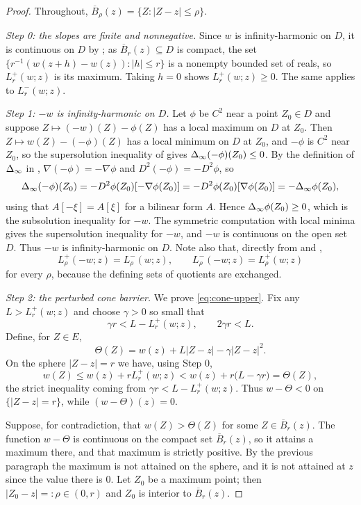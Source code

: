 \begin{proof}
Throughout, $\overline B_\rho(z)=\{Z:|Z-z|\le\rho\}$.

\emph{Step 0: the slopes are finite and nonnegative.}
Since $w$ is infinity-harmonic on $D$, it is continuous on $D$ by
; as $\overline B_r(z)\subseteq D$ is compact, the set
$\{r^{-1}(w(z+h)-w(z)):|h|\le r\}$ is a nonempty bounded set of reals, so
$L_r^+(w;z)$ is its maximum. Taking $h=0$ shows $L_r^+(w;z)\ge0$. The same
applies to $L_r^-(w;z)$.

\emph{Step 1: $-w$ is infinity-harmonic on $D$.}
Let $\phi$ be $C^2$ near a point $Z_0\in D$ and suppose
$Z\mapsto(-w)(Z)-\phi(Z)$ has a local maximum on $D$ at $Z_0$. Then
$Z\mapsto w(Z)-(-\phi)(Z)$ has a local minimum on $D$ at $Z_0$, and $-\phi$ is
$C^2$ near $Z_0$, so the supersolution inequality of
 gives $\Delta_{\infty}(-\phi)(Z_0)\le0$. By the definition of
$\Delta_{\infty}$ in , $\nabla(-\phi)=-\nabla\phi$ and
$D^2(-\phi)=-D^2\phi$, so
\[
  \Delta_{\infty}(-\phi)(Z_0)=-D^2\phi(Z_0)[-\nabla\phi(Z_0)]
   =-D^2\phi(Z_0)[\nabla\phi(Z_0)]=-\Delta_{\infty}\phi(Z_0),
\]
using that $A[-\xi]=A[\xi]$ for a bilinear form $A$. Hence
$\Delta_{\infty}\phi(Z_0)\ge0$, which is the subsolution inequality for $-w$. The
symmetric computation with local minima gives the supersolution inequality for
$-w$, and $-w$ is continuous on the open set $D$. Thus $-w$ is
infinity-harmonic on $D$. Note also that, directly from
 and ,
\begin{equation}\label{eq:cone-neg}
  L_\rho^+(-w;z)=L_\rho^-(w;z),\qquad
  L_\rho^-(-w;z)=L_\rho^+(w;z)
\end{equation}
for every $\rho$, because the defining sets of quotients are exchanged.

\emph{Step 2: the perturbed cone barrier.}
We prove \eqref{eq:cone-upper}. Fix any $L>L_r^+(w;z)$ and choose $\gamma>0$ so
small that
\[
  \gamma r<L-L_r^+(w;z),\qquad 2\gamma r<L .
\]
Define, for $Z\in E$,
\[
  \Theta(Z)=w(z)+L|Z-z|-\gamma|Z-z|^2 .
\]
On the sphere $|Z-z|=r$ we have, using Step 0,
\[
  w(Z)\le w(z)+rL_r^+(w;z)<w(z)+r\bigl(L-\gamma r\bigr)=\Theta(Z),
\]
the strict inequality coming from $\gamma r<L-L_r^+(w;z)$. Thus
$w-\Theta<0$ on $\{|Z-z|=r\}$, while $(w-\Theta)(z)=0$.

Suppose, for contradiction, that $w(Z)>\Theta(Z)$ for some
$Z\in\overline B_r(z)$. The function $w-\Theta$ is continuous on the compact set
$\overline B_r(z)$, so it attains a maximum there, and that maximum is strictly
positive. By the previous paragraph the maximum is not attained on the sphere,
and it is not attained at $z$ since the value there is $0$. Let $Z_0$ be a
maximum point; then $|Z_0-z|=:\rho\in(0,r)$ and $Z_0$ is interior to
$\overline B_r(z)$.


\end{proof}
